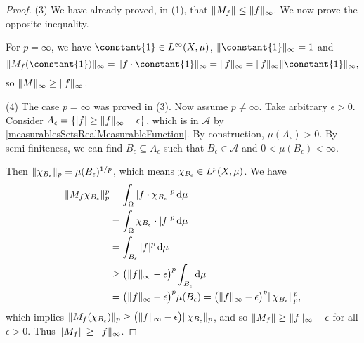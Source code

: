 \begin{proof}
(3) We have already proved, in (1), that $\lVert M_f\rVert \leq \lVert f\rVert_\infty$. We now prove the opposite inequality.

For $p = \infty$, we have $\constant{1} \in L^\infty(X,\mu)$, $\norm{\constant{1}}_\infty = 1$ and
\[ \norm{M_f(\constant{1})}_\infty = \norm{f\cdot \constant{1}}_\infty = \norm{f}_\infty = \norm{f}_\infty\norm{\constant{1}}_\infty, \]
so $\lVert M\rVert_\infty \geq \lVert f\rVert_\infty$.

(4) The case $p=\infty$ was proved in (3). Now assume $p\neq \infty$.
Take arbitrary $\epsilon > 0$. Consider $A_\epsilon = \{|f| \geq \lVert f\rVert_\infty-\epsilon\}$, which is in $\mathcal{A}$ by \ref{measurablesSetsRealMeasurableFunction}. By construction, $\mu(A_\epsilon) > 0$. By semi-finiteness, we can find $B_\epsilon\subseteq A_\epsilon$ such that $B_\epsilon\in \mathcal{A}$ and $0 < \mu(B_\epsilon) < \infty$.

Then $\lVert\chi_{B_\epsilon}\rVert_p = \mu(B_\epsilon)^{1/p}$, which means $\chi_{B_\epsilon}\in L^p(X, \mu)$. We have
\begin{align*}
\lVert M_f\chi_{B_\epsilon}\rVert_p^p &= \int_\Omega |f\cdot \chi_{B_\epsilon}|^{p}\operatorname{d \!}{\mu} \\
&= \int_\Omega \chi_{B_\epsilon}\cdot|f|^p\operatorname{d \!}{\mu} \\
&= \int_{B_\epsilon}|f|^p\operatorname{d \!}{\mu} \\
&\geq \big(\lVert f\rVert_\infty -\epsilon \big)^p\int_{B_\epsilon}\operatorname{d \!}{\mu} \\
&= \big(\lVert f\rVert_\infty -\epsilon \big)^p\mu(B_\epsilon) = \big(\lVert f\rVert_\infty -\epsilon \big)^p\lVert\chi_{B_\epsilon}\rVert_p^p,
\end{align*}
which implies $\lVert M_f(\chi_{B_\epsilon})\rVert_p \geq \big(\lVert f\rVert_\infty -\epsilon \big)\lVert\chi_{B_\epsilon}\rVert_p$, and so $\lVert M_f\rVert \geq \lVert f\rVert_\infty-\epsilon$ for all $\epsilon >0$. Thus $\lVert M_f\rVert \geq \lVert f\rVert_\infty$.
\end{proof}

